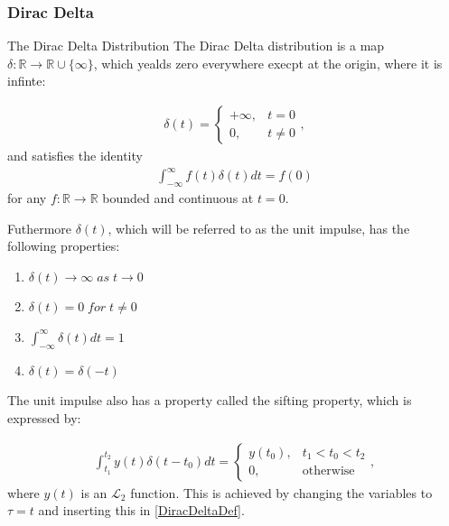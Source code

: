 \subsubsection{Dirac Delta}
\begin{definition}{The Dirac Delta Distribution} \label{DiracDeltaDef}
The Dirac Delta distribution is a map $\delta : \mathbb{R} \rightarrow \mathbb{R} \cup \{\infty\}$, which yealds zero everywhere execpt at the origin, where it is infinte:

\begin{align*}
\delta(t) =
    \begin{cases}
    +\infty,& t=0\\
    0, & t \neq 0
\end{cases},
\end{align*}
and satisfies the identity
\begin{align*}
    \int_{-\infty}^{\infty} f(t) \delta(t) dt = f(0)
\end{align*}
for any $f: \mathbb{R} \rightarrow \mathbb{R}$ bounded and continuous at $t=0$.
\end{definition}


Futhermore $\delta(t)$, which will be referred to as the unit impulse, has the following properties:
\begin{enumerate}
    \item $\delta(t) \rightarrow \infty \; as \; t \rightarrow 0$
    \item $\delta(t) =0 \; for \; t \neq 0$
    \item $\int_{-\infty}^{\infty} \delta(t) dt =1$
    \item $\delta(t)= \delta(-t)$
\end{enumerate}

\noindent The unit impulse also has a property called the sifting property, which is expressed by:

\begin{align*}
\int_{t_1}^{t_2} y(t) \delta(t-t_0)dt = 
    \begin{cases}
    y(t_0),& t_1<t_0<t_2\\
    0, & \text{otherwise}
\end{cases},
\end{align*}
where $y(t)$ is an $\mathcal{L}_2$ function. This is achieved by changing the variables to $\tau =t$ and inserting this in \autoref{DiracDeltaDef}.\cite{LectureNotes}
